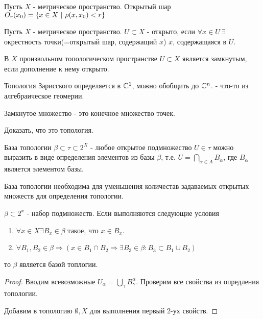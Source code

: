\begin{definition}
    Пусть $X$ - метрическое пространство. Открытый шар $O_r (x_0) = \left\{x \in X \ | \ \rho(x, x_0) < r\right\}$
\end{definition}

\begin{definition}
    Пусть $X$ - метрическое пространство. $U \subset X$ - открыто, если $\forall x \in U \ \exists$ окрестность точки(=открытый шар, содержащий $x$) $x$, содержащаяся в $U$. 
\end{definition}

\begin{definition}
    В $X$ произвольном топологическом пространстве $U \subset X$ является замкнутым, если дополнение к нему открыто.
\end{definition}

\begin{example}
    Топология Зарисского определяется в $\mathbb{C}^1$, можно обобщить до $\mathbb{C}^n$. - что-то из алгебраическое геомерии.

    Замкнутое множество - это конечное множество точек.
\end{example}
\begin{exercise}
    Доказать, что это топология.
\end{exercise}

\begin{definition}
    База топологии $\beta \subset \tau \subset 2^X$ - любое открытое подмножество $U \in \tau$ можно выразить в виде определения элементов из базы $\beta$, т.е. $U = \bigcap_{\alpha \in A} B_{\alpha}$, где $B_{\alpha}$ является элементом базы.
\end{definition}

База топологии необходима для уменьшения количестав задаваемых открытых множеств для определения топологии.

\wip
\begin{lemma}
    $\beta \subset 2^x$ - набор подмножеств. Если выполняются следующие условия
    \begin{enumerate}
        \item $\forall x \in X \exists B_x \in \beta$ такое, что $x \in B_x$.
        \item $\forall B_1, B_2 \in \beta \Rightarrow (x \in B_1 \cap B_2 \Rightarrow \exists B_3 \in \beta : B_3 \subset B_1 \cup B_2)$ 
    \end{enumerate}
    то $\beta$ является базой топлогии.
\end{lemma}
\begin{proof}
    Вводим всевозможные $U_{\alpha} = \bigcup_{\gamma} B_{\gamma}^{\alpha}$. Проверим все свойства из опредления топологии.

    Добавим в топологию $\emptyset, X$ для выполнения первый 2-ух свойств.
\end{proof}

